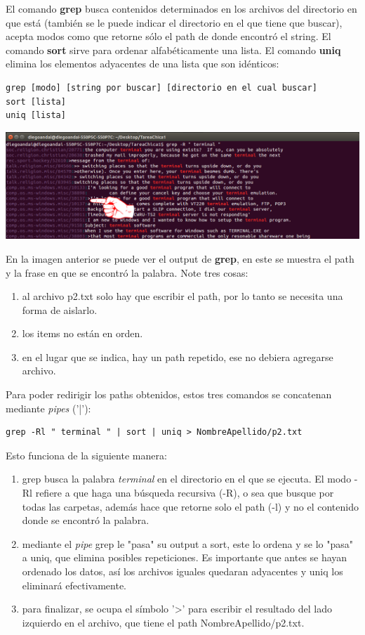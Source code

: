 \documentclass[a4paper,11pt]{article}
\theoremstyle{mytheor}
\begin{document}
El comando \textbf{grep} busca contenidos determinados en los archivos del directorio en que está (también se le puede indicar el directorio en el que tiene que buscar), acepta modos como que retorne sólo el path de donde encontró el string. El comando \textbf{sort} sirve para ordenar alfabéticamente una lista. El comando \textbf{uniq} elimina los elementos adyacentes de una lista que son idénticos:

\begin{lstlisting}
grep [modo] [string por buscar] [directorio en el cual buscar]
sort [lista]
uniq [lista]
\end{lstlisting}

\begin{center}
\includegraphics[scale=0.385]{tc1_10.png}
\end{center}

En la imagen anterior se puede ver el output de \textbf{grep}, en este se muestra el path y la frase en que se encontró la palabra. Note tres cosas:

\begin{enumerate}
    \item al archivo p2.txt solo hay que escribir el path, por lo tanto se necesita una forma de aislarlo.
    \item los items no están en orden.
    \item en el lugar que se indica, hay un path repetido, ese no debiera agregarse archivo.
\end{enumerate}

Para poder redirigir los paths obtenidos, estos tres comandos se concatenan mediante \textit{pipes} ('|'):

\begin{lstlisting}
grep -Rl " terminal " | sort | uniq > NombreApellido/p2.txt
\end{lstlisting}

Esto funciona de la siguiente manera:
\begin{enumerate}
    \item grep busca la palabra \textit{terminal} en el directorio en el que se ejecuta. El modo -Rl refiere a que haga una búsqueda recursiva (-R), o sea que busque por todas las carpetas, además hace que retorne solo el path (-l) y no el contenido donde se encontró la palabra.
    \item mediante el \textit{pipe} grep le "pasa" su output a sort, este lo ordena y se lo "pasa" a uniq, que elimina posibles repeticiones. Es importante que antes se hayan ordenado los datos, así los archivos iguales quedaran adyacentes y uniq los eliminará efectivamente.
    \item para finalizar, se ocupa el símbolo '>' para escribir el resultado del lado izquierdo en el archivo, que tiene el path  NombreApellido/p2.txt.
\end{enumerate}
\end{document}

